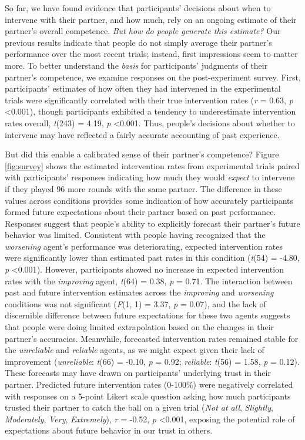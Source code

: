 \documentclass[10pt,letterpaper]{article}
\begin{document}
So far, we have found evidence that participants' decisions about when to intervene with their partner, and how much, rely on an ongoing estimate of their partner's overall competence. \textit{But how do people generate this estimate?} Our previous results indicate that people do not simply average their partner's performance over the most recent trials; instead, first impressions seem to matter more. To better understand the \textit{basis} for participants' judgments of their partner's competence, we examine responses on the post-experiment survey. First, participants' estimates of how often they had intervened in the experimental trials were significantly correlated with their true intervention rates (\textit{r} = 0.63, \textit{p} \textless{0.001}), though participants exhibited a tendency to underestimate intervention rates overall, \textit{t}(243) = 4.19, \textit{p} \textless{0.001}. Thus, people's decisions about whether to intervene may have reflected a fairly accurate accounting of past experience. 

But did this enable a calibrated sense of their partner's competence? Figure \ref{fig:survey} shows the estimated intervention rates from experimental trials paired with participants' responses indicating how much they would \textit{expect} to intervene if they played 96 more rounds with the same partner. The difference in these values across conditions provides some indication of how accurately participants formed future expectations about their partner based on past performance. Responses suggest that people's ability to explicitly forecast their partner's future behavior was limited. Consistent with people having recognized that the \textit{worsening} agent's performance was deteriorating, expected intervention rates were significantly lower than estimated past rates in this condition (\textit{t}(54) = -4.80, \textit{p} \textless{0.001}). However, participants showed no increase in expected intervention rates with the \textit{improving} agent, \textit{t}(64) = 0.38, \textit{p} = 0.71. The interaction between past and future intervention estimates across the \textit{improving} and \textit{worsening} conditions was not significant (\textit{F}(1, 1) = 3.37, \textit{p} = 0.07), and the lack of discernible difference between future expectations for these two agents suggests that people were doing limited extrapolation based on the changes in their partner's accuracies. Meanwhile, forecasted intervention rates remained stable for the \textit{unreliable} and \textit{reliable} agents, as we might expect given their lack of improvement (\textit{unreliable}: \textit{t}(66) = -0.10, \textit{p} = 0.92; \textit{reliable}: \textit{t}(56) = 1.58, \textit{p} = 0.12). These forecasts may have drawn on participants' underlying trust in their partner. Predicted future intervention rates (0-100\%) were negatively correlated with responses on a 5-point Likert scale question asking how much participants trusted their partner to catch the ball on a given trial (\textit{Not at all}, \textit{Slightly}, \textit{Moderately}, \textit{Very}, \textit{Extremely}), \textit{r} = -0.52, \textit{p} \textless{0.001}, exposing the potential role of expectations about future behavior in our trust in others.
\end{document}
